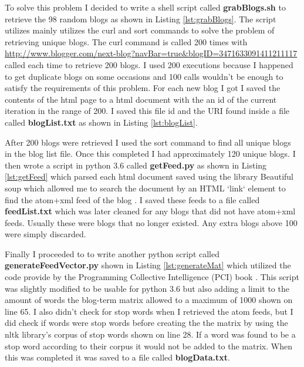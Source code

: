 \documentclass[letterpaper,11pt]{article}
\newcommand*{\srcPath}{../src}%
\begin{document}
To solve this problem I decided to write a shell script called \textbf{grabBlogs.sh} to retrieve the 98 random blogs as shown in Listing \ref{lst:grabBlogs}. The script utilizes mainly utilizes the curl and sort commands to solve the problem of retrieving unique blogs. The curl command is called 200 times with \url{http://www.blogger.com/next-blog?navBar=true&blogID=3471633091411211117} called each time to retrieve 200 blogs. I used 200 executions because I happened to get duplicate blogs on some occasions and 100 calls wouldn't be enough to satisfy the requirements of this problem. For each new blog I got I saved the contents of the html page to a html document with the an id of the current iteration in the range of 200. I saved this file id and the URI found inside a file called \textbf{blogList.txt} as shown in Listing \ref{lst:blogList}.

After 200 blogs were retrieved I used the sort command to find all unique blogs in the blog list file. Once this completed I had approximately 120 unique blogs. I then wrote a script in python 3.6 called \textbf{getFeed.py} as shown in Listing \ref{lst:getFeed} which parsed each html document saved using the library Beautiful soup which allowed me to search the document by an HTML `link` element to find the atom+xml feed of the blog \cite{beautifulsoupref}. I saved these feeds to a file called \textbf{feedList.txt} which was later cleaned for any blogs that did not have atom+xml feeds. Usually these were blogs that no longer existed. Any extra blogs above 100 were simply discarded.

Finally I proceeded to to write another python script called \textbf{generateFeedVector.py} shown in Listing \ref{lst:generateMat} which utilized the code provide by the Programming Collective Intelligence (PCI) book \cite{collectiveIntell}. This script was slightly modified to be usable for python 3.6 but also adding a limit to the amount of words the blog-term matrix allowed to a maximum of 1000 shown on line 65. I also didn't check for stop words when I retrieved the atom feeds, but I did check if words were stop words before creating the the matrix by using the nltk library's corpus of stop words shown on line 28. If a word was found to be a stop word according to their corpus it would not be added to the matrix. When this was completed it was saved to a file called \textbf{blogData.txt}.

 
\end{document}
